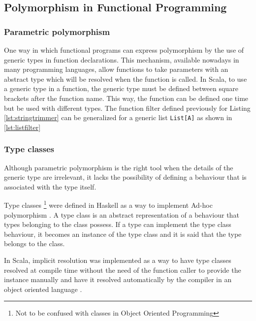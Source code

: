 \documentclass[../main.tex]{subfiles}
\begin{document}


\subsection{Polymorphism in Functional Programming}
\subsubsection{Parametric polymorphism}

One way in which functional programs can express polymorphism by the use of
generic types in function declarations. This mechanism, available nowadays in
many programming languages, allow functions to take parameters with an abstract
type which will be resolved when the function is called. In Scala, to use a
generic type in a function, the generic type must be defined between square
brackets after the function name. This way, the function can be defined one time
but be used with different types. The function filter defined previously for
Listing \ref{lst:stringtrimmer} can be generalized for a generic list
\texttt{List[A]} as shown in \ref{lst:listfilter}



\subsubsection{Type classes} Although parametric polymorphism is the right tool when the
details of the generic type are irrelevant, it lacks the possibility of defining a
behaviour that is associated with the type itself.

Type classes \footnote{Not to be confused with classes in Object Oriented Programming} were
defined in Haskell as a way to implement Ad-hoc polymorphism
\autocite{Hall1994TypeHaskell}. A type class is an abstract representation of a
behaviour that types belonging to the class possess. If a type can implement
the type class behaviour, it becomes an instance of the type class and it is said
that the type belongs to the class.

In Scala, implicit resolution was implemented as a way to have type classes
resolved at compile time without the need of the function caller to provide the
instance manually and have it resolved automatically by the compiler in an
object oriented language \autocite{Oliveira2010TypeImplicits}.
\end{document}
